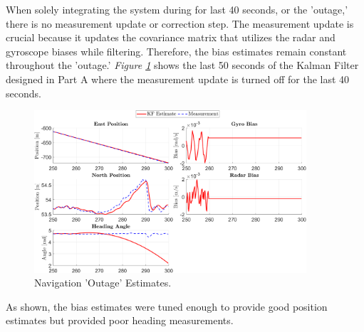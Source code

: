 \documentclass[10pt]{article}
\begin{document}
\begin{enumerate}[label=\textbf{\arabic*.}]
  When solely integrating the system during for last 40 seconds, or the 
  'outage,' there is no measurement update or correction step. The measurement 
  update is crucial because it updates the covariance matrix that utilizes the 
  radar and gyroscope biases while filtering. Therefore, the bias estimates 
  remain constant throughout the 'outage.' \emph{Figure \ref{f:3.3}} shows the 
  last 50 seconds of the Kalman Filter designed in Part A where the measurement 
  update is turned off for the last 40 seconds.
  \begin{figure}[H]
    \centering
    \includegraphics[width=0.9\textwidth]{p3_c2.png}
    \caption{Navigation 'Outage' Estimates.}
    \label{f:3.3}
  \end{figure}
  As shown, the bias estimates were tuned enough to provide good position 
  estimates but provided poor heading measurements.

  \vspace{24pt}


\end{enumerate}
\end{document}
